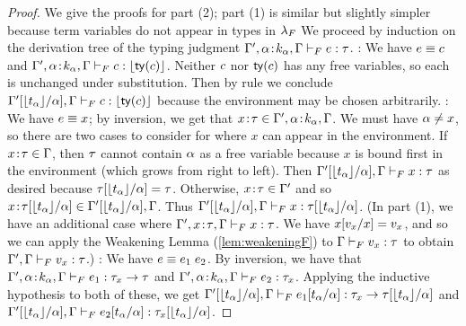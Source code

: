 \begin{proof}
  We give the proofs for part (2); part (1) is similar but slightly
  simpler because term variables do not appear in types in $\sysf$
  We proceed by induction on the derivation tree of the typing judgment
  $\hasftype{\tcenv', \bind{\al}{k_{\al}}, \tcenv}{\sexpr}{\sftype}$.
  \pfcase{\fPrim}: We have $\sexpr \equiv \sconst$ and
  $\hasftype{\tcenv', \bind{\al}{k_{\al}}, \tcenv}{\sconst}{\forgetreft{\ty{\sconst}}}$.
  Neither $\sconst$ nor $\ty{\sconst}$ has any free variables, so each is 
  unchanged under substitution. Then by rule \tPrim we conclude
  $\hasftype{\subst{\tcenv'}{\al}{\forgetreft{\stype_{\al}}}, \tcenv}{\sconst}{\forgetreft{\ty{\sconst}}}$ because the environment may be chosen arbitrarily.
  \pfcase{\fVar}: We have $\sexpr \equiv x$; by inversion, we get that 
  $\bind{x}{\sftype} \in \tcenv', \bind{\al}{k_{\al}}, \tcenv$. We must have
  $\tvar \neq x$, so there are two cases to consider for where $x$ can 
  appear in the environment. If $\bind{x}{\sftype} \in \tcenv$,  then $\sftype$
  cannot contain $\tvar$ as a free variable because $x$ is bound first in the environment (which grows from right to left). Then
  $\hasftype{\subst{\tcenv'}{\al}{\forgetreft{\stype_{\al}}}, \tcenv}{x}{\sftype}$
  as desired because $\subst{\sftype}{\tvar}{\forgetreft{\stype_{\al}}} = \sftype$.
  Otherwise, $\bind{x}{\sftype} \in \tcenv'$ and so 
  $\bind{x}{\subst{\sftype}{\tvar}{\forgetreft{\stype_{\al}}}} \in \subst{\tcenv'}{\al}{\forgetreft{\stype_{\al}}}, \tcenv$. Thus
  $\hasftype{\subst{\tcenv'}{\al}{\forgetreft{\stype_{\al}}}, \tcenv}{x}{\subst{\sftype}{\tvar}{\forgetreft{\stype_{\al}}}}$.
  (In part (1), we have an additional case where 
  $\hasftype{\tcenv', \bind{x}{\sftype}, \tcenv}{x}{\sftype}$. We have
  $\subst{x}{x}{\sval_x} = \sval_x$, and so we can apply 
  the Weakening Lemma (\ref{lem:weakeningF})
  to $\hasftype{\tcenv}{\sval_x}{\sftype}$ to obtain
  $\hasftype{\tcenv', \tcenv}{\sval_x}{\sftype}$.)
  \pfcase{\fApp}: We have $\sexpr \equiv \app{\sexpr_1}{\sexpr_2}$. By inversion,
  we have that
  $\hasftype{\tcenv', \bind{\al}{k_{\al}}, \tcenv}{\sexpr_1}{\funcftype{\sftype_x}{\sftype}}$
  and $\hasftype{\tcenv', \bind{\al}{k_{\al}}, \tcenv}{\sexpr_2}{\sftype_x}$.
  Applying the inductive hypothesis to both of these, we get
  $\hasftype{\subst{\tcenv'}{\al}{\forgetreft{\stype_{\al}}}, \tcenv}{\subst{\sexpr_1}{\tvar}{\stype_{\tvar}}}{\subst{\funcftype{\sftype_x}{\sftype}}{\tvar}{\forgetreft{\stype_{\tvar}}}}$
  and
  $\hasftype{\subst{\tcenv'}{\al}{\forgetreft{\stype_{\al}}}, \tcenv}{\subst{\sexpr_2}{\tvar}{\stype_{\tvar}}}{\subst{\sftype_x}{\tvar}{\forgetreft{\stype_{\tvar}}}}$. 

\end{proof}
